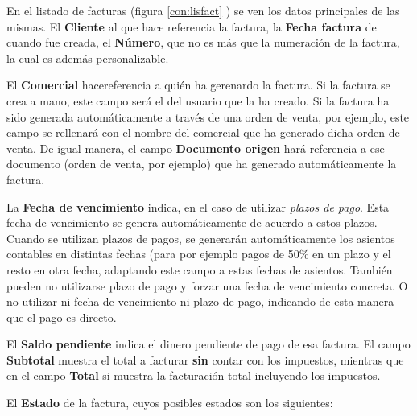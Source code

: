 En el listado de facturas (figura \ref{con:lisfact} ) se ven los datos principales de las mismas. El \textbf{Cliente} al que hace referencia la factura, la \textbf{Fecha factura} de cuando fue creada, el \textbf{Número}, que no es más que la numeración de la factura, la cual es además personalizable. 

El \textbf{Comercial} hacereferencia a quién ha gerenardo la factura. Si la factura se crea a mano, este campo será el del usuario
que la ha creado. Si la factura ha sido generada automáticamente a través de una orden de venta, por ejemplo, este campo se rellenará con el nombre del comercial que ha generado dicha orden de venta. De igual manera, el campo \textbf{Documento origen} hará referencia a ese documento (orden de venta, por ejemplo) que ha generado automáticamente la factura.

La \textbf{Fecha de vencimiento} indica, en el caso de utilizar \emph{plazos de pago}. Esta fecha de vencimiento se genera automáticamente de acuerdo a estos plazos. Cuando se utilizan plazos de pagos, se generarán automáticamente los asientos contables en distintas fechas (para por  ejemplo pagos de 50\% en un plazo y el resto en otra fecha, adaptando este campo a estas fechas de asientos. También pueden no utilizarse plazo de pago y forzar una fecha de vencimiento concreta. O no utilizar ni fecha de vencimiento ni plazo de pago, indicando de esta manera que el pago es directo.

El \textbf{Saldo pendiente} indica el dinero pendiente de pago de esa factura. El campo \textbf{Subtotal} muestra el total a facturar \textbf{sin} contar con los impuestos, mientras que en el campo \textbf{Total} si muestra la facturación total incluyendo los impuestos.

El \textbf{Estado} de la factura, cuyos posibles estados son los siguientes:

